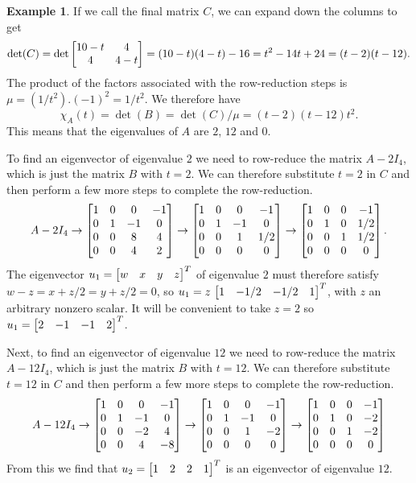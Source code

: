 \documentclass[reqno]{amsart}
\theoremstyle{definition}
\newtheorem{example}[theorem]{Example}
\begin{document}
\begin{example}
 If we call the final matrix $C$, we can expand down the columns to
 get  
 \[ \det(C) = \det\left[\begin{matrix} 10-t & 4 \\ 4 & 4-t \end{matrix}\right]
     = (10-t)(4-t)-16 = t^2-14t+24 = (t-2)(t-12).
 \]
 The product of the factors associated with the row-reduction steps is
 $\mu=(1/t^2).(-1)^2=1/t^2$.  We therefore have 
 \[ \chi_A(t)=\det(B)=\det(C)/\mu = (t-2)(t-12)t^2. \]
 This means that the eigenvalues of $A$ are $2$, $12$ and $0$.

 To find an eigenvector of eigenvalue $2$ we need to row-reduce the
 matrix $A-2I_4$, which is just the matrix $B$ with $t=2$.  We can
 therefore substitute $t=2$ in $C$ and then perform a few more steps
 to complete the row-reduction.
 \[ A-2I_4 \to
    \left[\begin{matrix} 1   & 0   & 0    & -1 \\
         0   & 1   & -1   & 0 \\
         0   & 0   & 8    & 4 \\
         0   & 0   & 4    & 2 \end{matrix}\right]         
    \to 
    \left[\begin{matrix} 1   & 0   & 0    & -1 \\
         0   & 1   & -1   & 0 \\
         0   & 0   & 1    & 1/2 \\
         0   & 0   & 0    & 0 \end{matrix}\right]         
    \to 
    \left[\begin{matrix} 1   & 0   & 0    & -1 \\
         0   & 1   & 0    & 1/2 \\
         0   & 0   & 1    & 1/2 \\
         0   & 0   & 0    & 0 \end{matrix}\right].         
 \]
 The eigenvector $u_1=\left[\begin{matrix} w&x&y&z\end{matrix}\right]^T$ of eigenvalue $2$ must
 therefore satisfy $w-z=x+z/2=y+z/2=0$, so
 $u_1=z\,\left[\begin{matrix} 1&-1/2&-1/2&1\end{matrix}\right]^T$, with $z$ an arbitrary nonzero
 scalar.  It will be
 convenient to take $z=2$ so $u_1=\left[\begin{matrix} 2&-1&-1&2\end{matrix}\right]^T$.

 Next, to find an eigenvector of eigenvalue $12$ we need to row-reduce the
 matrix $A-12I_4$, which is just the matrix $B$ with $t=12$.  We can
 therefore substitute $t=12$ in $C$ and then perform a few more steps
 to complete the row-reduction.
 \[ A-12I_4 \to 
    \left[\begin{matrix} 1   & 0   & 0    & -1 \\
         0   & 1   & -1   & 0 \\
         0   & 0   & -2   & 4 \\
         0   & 0   & 4    & -8 \end{matrix}\right]         
    \to
    \left[\begin{matrix} 1   & 0   & 0    & -1 \\
         0   & 1   & -1   & 0 \\
         0   & 0   & 1    & -2 \\
         0   & 0   & 0    & 0 \end{matrix}\right]         
    \to
    \left[\begin{matrix} 1   & 0   & 0    & -1 \\
         0   & 1   & 0    & -2 \\
         0   & 0   & 1    & -2 \\
         0   & 0   & 0    & 0 \end{matrix}\right]         
 \]
 From this we find that $u_2=\left[\begin{matrix} 1&2&2&1\end{matrix}\right]^T$ is an eigenvector of
 eigenvalue $12$.


\end{example}
\end{document}
